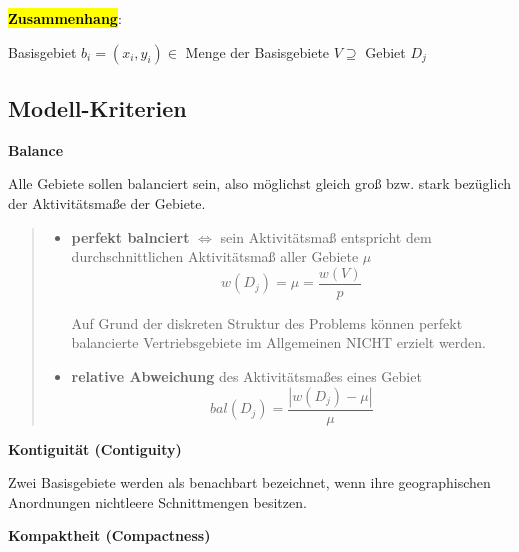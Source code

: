     \par \textbf{\hl{Zusammenhang}}:

    Basisgebiet $b_i = (x_i, y_i) \in $ Menge der Basisgebiete $V \supseteq$ Gebiet $D_j$
    

    \subsection{Modell-Kriterien} %
    \label{sub:modell_kriterien}
      
      \par \textbf{Balance}

      \par Alle Gebiete sollen balanciert sein, also möglichst gleich groß bzw. stark bezüglich der Aktivitätsmaße der Gebiete.

        \begin{quote}
          \begin{itemize}

            \item \textbf{perfekt balnciert} $\Leftrightarrow$ sein Aktivitätsmaß entspricht dem durchschnittlichen Aktivitätsmaß aller Gebiete $\mu$
            \begin{equation}
              \label{mu}
              w(D_j) = \mu = \frac{w(V)}{p}
            \end{equation}

            Auf Grund der diskreten Struktur des Problems können perfekt balancierte Vertriebsgebiete im Allgemeinen NICHT erzielt werden.

            \item \textbf{relative Abweichung} des Aktivitätsmaßes eines Gebiet
            \begin{equation*}
              bal(D_j) = \frac{|w(D_j) - \mu |}{\mu}
            \end{equation*}
          \end{itemize}
        \end{quote}
        

      \par \textbf{Kontiguität (Contiguity)}

      \par Zwei Basisgebiete werden als benachbart bezeichnet, wenn ihre geographischen Anordnungen nichtleere Schnittmengen besitzen.

      \par \textbf{Kompaktheit (Compactness)}

